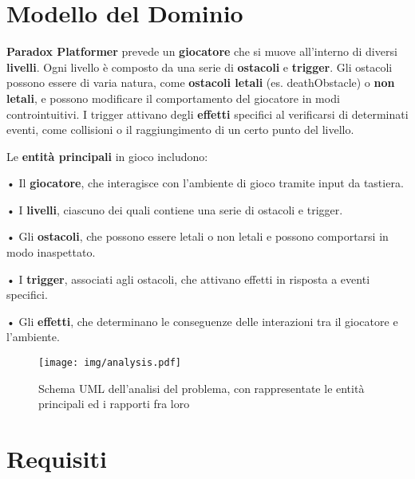\documentclass[a4paper,12pt]{report}
\begin{document}
\section{Modello del Dominio}

\textbf{Paradox Platformer} prevede un \textbf{giocatore} che si muove all'interno di diversi \textbf{livelli}. Ogni livello è composto da una serie di \textbf{ostacoli} e \textbf{trigger}. Gli ostacoli possono essere di varia natura, come \textbf{ostacoli letali} (es. deathObstacle) o \textbf{non letali}, e possono modificare il comportamento del giocatore in modi controintuitivi. I trigger attivano degli \textbf{effetti} specifici al verificarsi di determinati eventi, come collisioni o il raggiungimento di un certo punto del livello.

Le \textbf{entità principali} in gioco includono:

• Il \textbf{giocatore}, che interagisce con l'ambiente di gioco tramite input da tastiera.

• I \textbf{livelli}, ciascuno dei quali contiene una serie di ostacoli e trigger.

• Gli \textbf{ostacoli}, che possono essere letali o non letali e possono comportarsi in modo inaspettato.

• I \textbf{trigger}, associati agli ostacoli, che attivano effetti in risposta a eventi specifici.

• Gli \textbf{effetti}, che determinano le conseguenze delle interazioni tra il giocatore e l'ambiente.

\begin{figure}[H]
	\centering{}
	\texttt{[image: img/analysis.pdf]}
	\caption{Schema UML dell'analisi del problema, con rappresentate le entità principali ed i rapporti fra loro}
	\label{img:analysis}
\end{figure}

\section{Requisiti}
\end{document}
